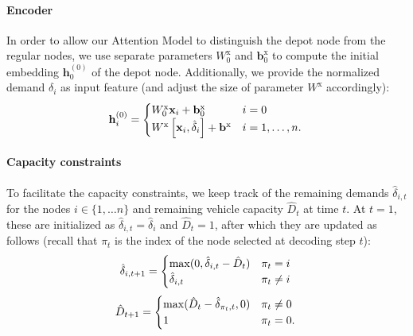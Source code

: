 \paragraph{Encoder}
In order to allow our Attention Model to distinguish the depot node from the regular nodes, we use separate parameters $W_0^{\text{x}}$ and $\mathbf{b}_0^{\text{x}}$ to compute the initial embedding $\mathbf{h}_0^{(0)}$ of the depot node. Additionally, we provide the normalized demand $\delta_i$ as input feature (and adjust the size of parameter $W^{\text{x}}$ accordingly):
\begin{equation}
\mathbf{h}_i^{(0)} = \begin{cases}
		W_0^{\text{x}} \mathbf{x}_i + \mathbf{b}_0^{\text{x}} & i = 0 \\
        W^{\text{x}} \left[\mathbf{x}_i, \hat{\delta}_i\right] + \mathbf{b}^{\text{x}} & i = 1, \ldots, n.
\end{cases} \\
\end{equation}

\paragraph{Capacity constraints}
To facilitate the capacity constraints, we keep track of the remaining demands $\hat{\delta}_{i,t}$ for the nodes $i \in \{1, \ldots n\}$ and remaining vehicle capacity $\hat{D}_t$ at time $t$. At $t = 1$, these are initialized as $\hat{\delta}_{i,t} = \hat{\delta}_i$ and $\hat{D}_t = 1$, after which they are updated as follows (recall that $\pi_t$ is the index of the node selected at decoding step $t$):
\begin{equation}
	\hat{\delta}_{i,t+1} = \begin{cases}
		\max(0, \hat{\delta}_{i,t} - \hat{D}_t) & \pi_{t} = i \\
        \hat{\delta}_{i,t} & \pi_{t} \neq i \\
\end{cases} \\
\end{equation}
\begin{equation}
	\hat{D}_{t+1} = \begin{cases}
		\max(\hat{D}_t - \hat{\delta}_{\pi_t, t}, 0) & \pi_t \neq 0 \\
        1 & \pi_t = 0.
\end{cases} \\
\end{equation}

